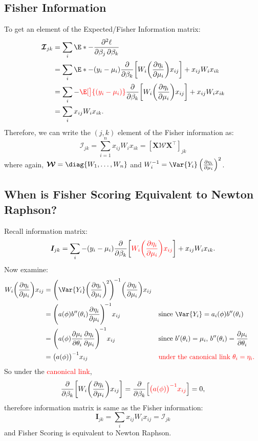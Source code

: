 \documentclass{article}\usepackage[]{graphicx}\usepackage[svgnames]{xcolor}
\providecommand{\Matrix}[1]{\bm{#1}}
\providecommand{\MatrixCal}[1]{\bm{\mathcal{#1}}}
\begin{document}
\subsection*{Fisher Information}
To get an element of the Expected/Fisher Information matrix:
\begin{align*}
    \MatrixCal{I}_{jk}
     & =\sum_i\E*{-\pdv{\ell}{\beta_j,\beta_k}}                                                                                                \\
     & =\sum_i\E*{-(y_i-\mu_i)\pdv*{\biggl[W_i\biggl(\pdv{\eta_i}{\mu_i}\biggr)x_{ij}\biggr]}{\beta_k}+x_{ij}W_i x_{ik}}                       \\
     & =\sum_i-\textcolor{Red}{\E[\big]{(y_i-\mu_i)}}\pdv*{\biggl[W_i\biggl(\pdv{\eta_i}{\mu_i}\biggr)x_{ij}\biggr]}{\beta_k}+x_{ij}W_i x_{ik} \\
     & =\sum_i x_{ij}W_i x_{ik}.
\end{align*}
Therefore, we can write the $(j, k)$ element of the Fisher information as:
\[ \MatrixCal{I}_{jk}=\sum_{i=1}^{n} x_{ij}W_i x_{ik}=[\Matrix{X}\Matrix{\MatrixCal{W}}\Matrix{X}^\top]_{jk} \]
where again, $ \MatrixCal{W}=\diag{W_1,\ldots,W_n} $ and $ W_i^{-1}=\Var{Y_i}\pdv{\eta_i}{\mu_i}^2 $.
\subsection*{When is Fisher Scoring Equivalent to Newton Raphson?}
Recall information matrix:
\[  \Matrix{I}_{jk}=\sum_i -(y_i-\mu_i)\pdv*{\biggl[\textcolor{Red}{W_i\biggl(\pdv{\eta_i}{\mu_i}\biggr)x_{ij}}\biggr]}{\beta_k}+x_{ij}W_i x_{ik}. \]
Now examine:
\begin{align*}
    W_i\biggl(\pdv{\eta_i}{\mu_i}\biggr)x_{ij}
     & =\Biggl(\Var{Y_i}\biggl(\pdv{\eta_i}{\mu_i}\biggr)^{\!2}\Biggr)^{\!-1}\biggl(\pdv{\eta_i}{\mu_i}\biggr)x_{ij}                                                                                                        \\
     & =\Biggl(a(\phi)b^{\prime\prime}(\theta_i)\pdv{\eta_i}{\mu_i}\Biggr)^{\!-1}x_{ij}                              &  & \text{since $\Var{Y_i}=a_i(\phi)b^{\prime\prime}(\theta_i)$}                                      \\
     & =\Biggl(a(\phi)\pdv{\mu_i}{\theta_i}\pdv{\eta_i}{\mu_i} \Biggr)^{\!-1}x_{ij}                                  &  & \text{since $ b^{\prime}(\theta_i)=\mu_i $, $ b^{\prime\prime}(\theta_i)=\pdv{\mu_i}{\theta_i} $} \\
     & =\bigl(a(\phi)\bigr)^{-1}x_{ij}                                                                               &  & \text{\textcolor{Red}{under the canonical link $\theta_i=\eta_i$.}}
\end{align*}
So under the \textcolor{Red}{canonical link},
\[ \pdv*{\biggl[W_i\biggl(\pdv{\eta_i}{\mu_i}\biggr)x_{ij}\biggr]}{\beta_k}=\pdv*{\Bigl[\textcolor{Red}{\bigl(a(\phi)\bigr)^{-1}x_{ij}}\Bigr]}{\beta_k}=0, \]
therefore information matrix is same as the Fisher information:
\[ \Matrix{I}_{jk}=\sum_{i}x_{ij}W_i x_{ij}=\MatrixCal{I}_{jk}  \]
and Fisher Scoring is equivalent to Newton Raphson.
\end{document}
